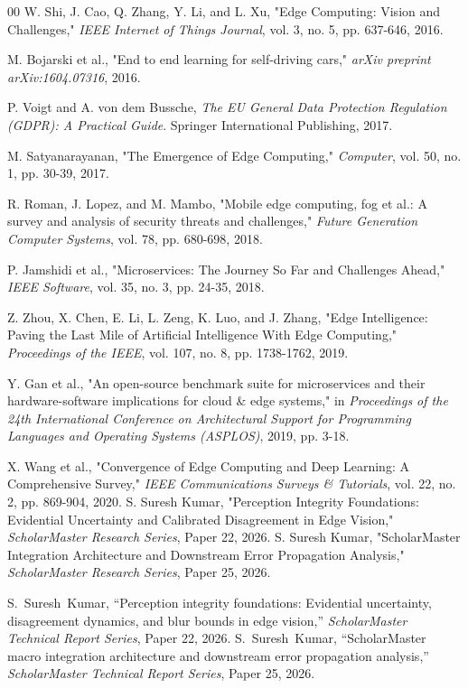 \documentclass[conference]{IEEEtran}
\begin{document}
\begin{thebibliography}{00}
 W. Shi, J. Cao, Q. Zhang, Y. Li, and L. Xu, "Edge Computing: Vision and Challenges," \textit{IEEE Internet of Things Journal}, vol. 3, no. 5, pp. 637-646, 2016.

 M. Bojarski et al., "End to end learning for self-driving cars," \textit{arXiv preprint arXiv:1604.07316}, 2016.

 P. Voigt and A. von dem Bussche, \textit{The EU General Data Protection Regulation (GDPR): A Practical Guide}. Springer International Publishing, 2017.

 M. Satyanarayanan, "The Emergence of Edge Computing," \textit{Computer}, vol. 50, no. 1, pp. 30-39, 2017.

 R. Roman, J. Lopez, and M. Mambo, "Mobile edge computing, fog et al.: A survey and analysis of security threats and challenges," \textit{Future Generation Computer Systems}, vol. 78, pp. 680-698, 2018.

 P. Jamshidi et al., "Microservices: The Journey So Far and Challenges Ahead," \textit{IEEE Software}, vol. 35, no. 3, pp. 24-35, 2018.

 Z. Zhou, X. Chen, E. Li, L. Zeng, K. Luo, and J. Zhang, "Edge Intelligence: Paving the Last Mile of Artificial Intelligence With Edge Computing," \textit{Proceedings of the IEEE}, vol. 107, no. 8, pp. 1738-1762, 2019.

 Y. Gan et al., "An open-source benchmark suite for microservices and their hardware-software implications for cloud \& edge systems," in \textit{Proceedings of the 24th International Conference on Architectural Support for Programming Languages and Operating Systems (ASPLOS)}, 2019, pp. 3-18.

 X. Wang et al., "Convergence of Edge Computing and Deep Learning: A Comprehensive Survey," \textit{IEEE Communications Surveys \& Tutorials}, vol. 22, no. 2, pp. 869-904, 2020.
 S. Suresh Kumar, "Perception Integrity Foundations: Evidential Uncertainty and Calibrated Disagreement in Edge Vision," \textit{ScholarMaster Research Series}, Paper 22, 2026.
 S. Suresh Kumar, "ScholarMaster Integration Architecture and Downstream Error Propagation Analysis," \textit{ScholarMaster Research Series}, Paper 25, 2026.

 S.~Suresh~Kumar, ``Perception integrity foundations: Evidential uncertainty, disagreement dynamics, and blur bounds in edge vision,'' \emph{ScholarMaster Technical Report Series}, Paper 22, 2026.
 S.~Suresh~Kumar, ``ScholarMaster macro integration architecture and downstream error propagation analysis,'' \emph{ScholarMaster Technical Report Series}, Paper 25, 2026.
\end{thebibliography}
\end{document}
